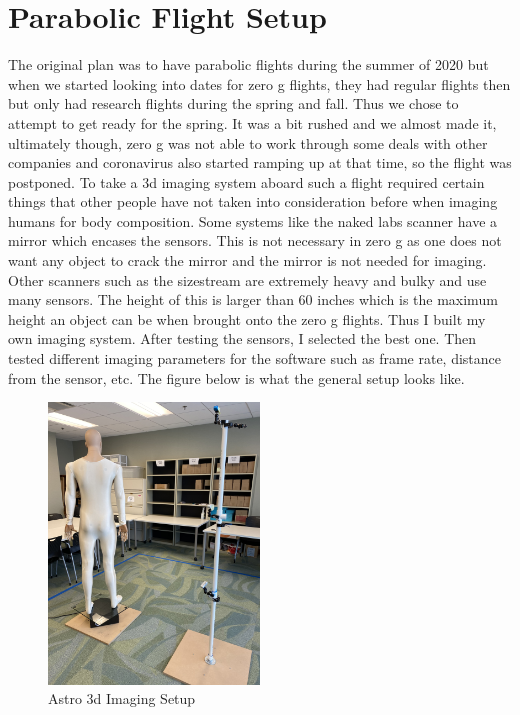 \section{Parabolic Flight Setup}
The original plan was to have parabolic flights during the summer of 2020 but when we started looking into dates for zero g flights, they had regular flights then but only had research flights during the spring and fall. Thus we chose to attempt to get ready for the spring. It was a bit rushed and we almost made it, ultimately though, zero g was not able to work through some deals with other companies and coronavirus also started ramping up at that time, so the flight was postponed.
To take a 3d imaging system aboard such a flight required certain things that other people have not taken into consideration before when imaging humans for body composition. Some systems like the naked labs scanner have a mirror which encases the sensors. This is not necessary in zero g as one does not want any object to crack the mirror and the mirror is not needed for imaging. Other scanners such as the sizestream are extremely heavy and bulky and use many sensors. The height of this is larger than 60 inches which is the maximum height an object can be when brought onto the zero g flights. Thus I built my own imaging system. After testing the sensors, I selected the best one. Then tested different imaging parameters for the software such as frame rate, distance from the sensor, etc.
The figure below is what the general setup looks like.
\begin{figure}[!htb]
	\caption{Astro 3d Imaging Setup}
	\centering
	\includegraphics[width=0.5\textwidth, angle=-90]{images/astro_setup.jpg}
\end{figure}

